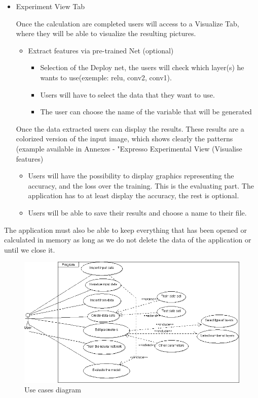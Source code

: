 \begin{itemize}
   \item Experiment View Tab
   
   Once the calculation are completed users will access to a Visualize Tab, where they will be able to visualize  the resulting pictures.
   \begin{itemize}
       \item Extract features via pre-trained Net (optional)
       \begin{itemize}
           \item Selection of the Deploy net, the users will check which layer(s) he wants to use(exemple: relu, conv2, conv1).
           \item Users will have to select the data that they want to use.
           \item The user can choose the name of the variable that will be generated
       \end{itemize}
   \end{itemize}
   Once the data extracted users can display the results. These results are a colorized version of the input image, which shows clearly the patterns (example available in Annexes - "Expresso Experimental View (Visualise features)
   
   \begin{itemize}
   \item Users will have the possibility to display graphics representing the accuracy, and the loss over the training. This is the evaluating part. The application has to at least display the accuracy, the rest is optional.
   \item Users will be able to save their results and choose a name to their file.
   
   \end{itemize}
   
\end{itemize}



The application must also be able to keep everything that has been opened or calculated in memory as long as we do not delete the data of the application or until we close it.

\begin{figure}[!ht]
\center
    \includegraphics[scale=0.6]{figures/useCase2.png}
    \caption{Use cases diagram}
\end{figure}

